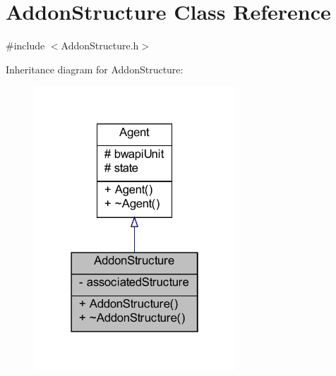 \hypertarget{classAddonStructure}{\section{Addon\-Structure Class Reference}
\label{classAddonStructure}
}


{\ttfamily \#include $<$Addon\-Structure.\-h$>$}



Inheritance diagram for Addon\-Structure\-:
\nopagebreak
\begin{figure}[H]
\begin{center}
\leavevmode
\includegraphics[width=214pt]{classAddonStructure__inherit__graph}
\end{center}
\end{figure}


